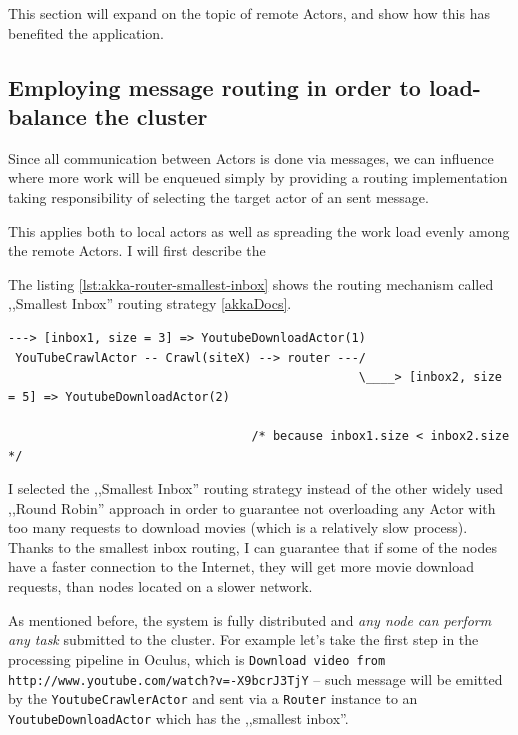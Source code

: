 This section will expand on the topic of remote Actors, and show how this has benefited the application.



\subsection{Employing message routing in order to load-balance the cluster}

Since all communication between Actors is done via messages, we can influence where more work will be enqueued simply by providing a routing implementation
taking responsibility of selecting the target actor of an sent message.

This applies both to local actors as well as spreading the work load evenly among the remote Actors. I will first describe the 

The listing \ref{lst:akka-router-smallest-inbox} shows the routing mechanism called ,,Smallest Inbox'' routing strategy \ref{akkaDocs}.

\begin{lstlisting}[caption={smallest-inbox routing algorithm},label={lst:akka-router-smallest-inbox}]
                                                  ---> [inbox1, size = 3] => YoutubeDownloadActor(1)
 YouTubeCrawlActor -- Crawl(siteX) --> router ---/
                                                 \____> [inbox2, size = 5] => YoutubeDownloadActor(2)
                                                                   
                                  /* because inbox1.size < inbox2.size */ 
\end{lstlisting}

I selected the ,,Smallest Inbox'' routing strategy instead of the other widely used ,,Round Robin'' approach in order to guarantee not overloading any Actor with too many requests to download movies (which is a relatively slow process). Thanks to the smallest inbox routing, I can guarantee that if some of the nodes have a faster connection to the Internet, they will get more movie download requests, than nodes located on a slower network.

As mentioned before, the system is fully distributed and \textit{any node can perform any task} submitted to the cluster. For example let's take the first step in the processing pipeline in Oculus, which is \verb|Download video from http://www.youtube.com/watch?v=-X9bcrJ3TjY| -- such message will be emitted by the \verb|YoutubeCrawlerActor| and sent via a \verb|Router| instance to an \verb|YoutubeDownloadActor| which has the ,,smallest inbox''.


